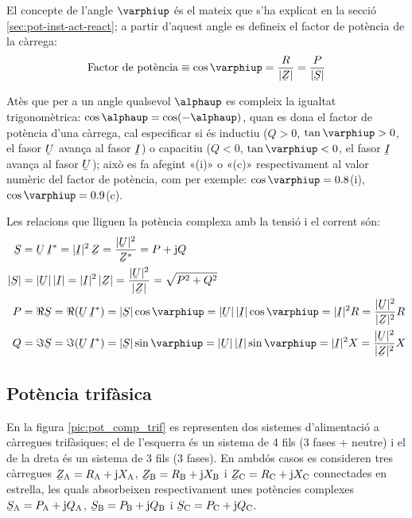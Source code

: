 El concepte de l'angle $\varphiup$ és el mateix que s'ha explicat en la secció \ref{sec:pot-inst-act-react}; a partir d'aquest angle es
defineix el factor de potència de la càrrega:
\begin{equation}
   \text{Factor de potència} \equiv \cos\varphiup = \frac{R}{|\cmplx{Z}|} =
   \frac{P}{|\cmplx{S}|}
\end{equation}

Atès que per a un angle qualsevol $\alphaup$ es compleix la igualtat
trigonomètrica: $\cos\alphaup = \cos(-\alphaup)$, quan es dona el factor
de potència d'una càrrega, cal especificar si és inductiu ($Q>0$,
$\tan\varphiup>0$, el fasor $\cmplx{U}$ avança al fasor $\cmplx{I}$) o
capacitiu ($Q<0$, $\tan\varphiup<0$, el fasor $\cmplx{I}$ avança al fasor $\cmplx{U}$); això es fa
afegint «(i)» o «(c)» respectivament al valor numèric del factor
de potència, com per exemple: $\cos\varphiup=\num{0,8}$(i),
$\cos\varphiup=\num{0,9}$(c).

Les relacions que lliguen la potència complexa amb la tensió i el corrent són:
\begin{align}
   \cmplx{S} &=  \cmplx{U} \,\cmplx{I}^* =
   |\cmplx{I}|^2 \,\cmplx{Z} = \frac{|\cmplx{U}|^2}{\cmplx{Z}^*} =
   P + \ju Q \label{eq:s_mono1}\\
   |\cmplx{S}| &= |\cmplx{U}| \,|\cmplx{I}| =
   |\cmplx{I}|^2 \,|\cmplx{Z}| = \frac{|\cmplx{U}|^2}{|\cmplx{Z}|} =
   \sqrt{P^2+Q^2} \\
   P &= \Re\cmplx{S} = \Re (\cmplx{U} \, \cmplx{I}^*) = |\cmplx{S}| \cos\varphiup =
   |\cmplx{U}|\, |\cmplx{I}| \cos\varphiup = |\cmplx{I}|^2 R =
   \frac{|\cmplx{U}|^2}{|\cmplx{Z}|^2}R\\
   Q &= \Im\cmplx{S} = \Im (\cmplx{U} \, \cmplx{I}^*) = |\cmplx{S}| \sin\varphiup =
   |\cmplx{U}| \,|\cmplx{I}|\sin\varphiup  = |\cmplx{I}|^2 X =
   \frac{|\cmplx{U}|^2}{|\cmplx{Z}|^2}X
\end{align}

\subsection{Potència trifàsica}  \label{sec:pot-trif}

En la figura \vref{pic:pot_comp_trif} es representen dos sistemes
d'alimentació a càrregues trifàsiques; el de l'esquerra és un
sistema de 4 fils (3 fases + neutre) i el de la dreta és un sistema
de 3 fils (3 fases). En ambdós casos es consideren tres càrregues
$\cmplx{Z}\ped{A} = R\ped{A} + \ju X\ped{A}$, $\cmplx{Z}\ped{B}=
R\ped{B} + \ju X\ped{B}$ i $\cmplx{Z}\ped{C}= R\ped{C} + \ju X\ped{C}$
connectades en estrella, les quals absorbeixen respectivament unes
potències complexes $\cmplx{S}\ped{A} = P\ped{A} + \ju Q\ped{A}$,
$\cmplx{S}\ped{B}= P\ped{B} + \ju Q\ped{B}$ i $\cmplx{S}\ped{C}=
P\ped{C} + \ju Q\ped{C}$.

